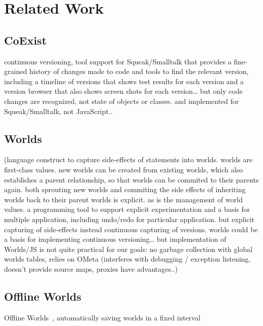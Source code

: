 \chapter{Related Work} \label{sec:RELATED_WORK}




\section{CoExist}

\cite{Steinert2012COE}
continuous versioning, tool support for Squeak/Smalltalk that provides a fine-grained history of changes made to code and tools to find the relevant version, including a timeline of versions that shows test results for each version and a version browser that also shows screen shots for each version… but only code changes are recognized, not state of objects or classes. and implemented for Squeak/Smalltalk, not JavaScript..


\section{Worlds}

(language construct to capture side-effects of statements into worlds. worlds are first-class values. new worlds can be created from existing worlds, which also establishes a parent relationship, so that worlds can be commited to their parents again. both sprouting new worlds and commiting the side effects of inheriting worlds back to their parent worlds is explicit. as is the management of world values. a programming tool to support explicit experimentation and a basis for multiple application, including undo/redo for particular application. but explicit capturing of side-effects instead continuous capturing of versions. 
worlds could be a basis for implementing continuous versioning… but implementation of Worlds/JS is not quite practical for our goals: no garbage collection with global worlds tables, relies on OMeta (interferes with debugging / exception listening, doesn’t provide source maps, proxies have advantages..)



\section{Offline Worlds}
Offline Worlds~\cite{Czuchra2012OfW}, automatically saving worlds in a fixed interval

